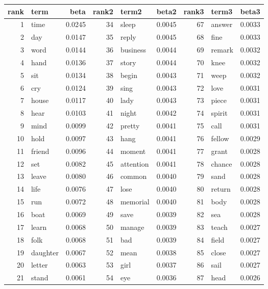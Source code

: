\begin{table}[ht]
\centering
\begin{tabular}{rlrrlrrlr}
  \hline
rank & term & beta & rank2 & term2 & beta2 & rank3 & term3 & beta3 \\ 
  \hline
1 & time & 0.0245 & 34 & sleep & 0.0045 & 67 & answer & 0.0033 \\ 
  2 & day & 0.0147 & 35 & reply & 0.0045 & 68 & fine & 0.0033 \\ 
  3 & word & 0.0144 & 36 & business & 0.0044 & 69 & remark & 0.0032 \\ 
  4 & hand & 0.0136 & 37 & story & 0.0044 & 70 & knee & 0.0032 \\ 
  5 & sit & 0.0134 & 38 & begin & 0.0043 & 71 & weep & 0.0032 \\ 
  6 & cry & 0.0124 & 39 & sing & 0.0043 & 72 & love & 0.0031 \\ 
  7 & house & 0.0117 & 40 & lady & 0.0043 & 73 & piece & 0.0031 \\ 
  8 & hear & 0.0103 & 41 & night & 0.0042 & 74 & spirit & 0.0031 \\ 
  9 & mind & 0.0099 & 42 & pretty & 0.0041 & 75 & call & 0.0031 \\ 
  10 & hold & 0.0097 & 43 & hang & 0.0041 & 76 & fellow & 0.0029 \\ 
  11 & friend & 0.0096 & 44 & moment & 0.0041 & 77 & grant & 0.0028 \\ 
  12 & set & 0.0082 & 45 & attention & 0.0041 & 78 & chance & 0.0028 \\ 
  13 & leave & 0.0080 & 46 & common & 0.0040 & 79 & sand & 0.0028 \\ 
  14 & life & 0.0076 & 47 & lose & 0.0040 & 80 & return & 0.0028 \\ 
  15 & run & 0.0072 & 48 & memorial & 0.0040 & 81 & body & 0.0028 \\ 
  16 & boat & 0.0069 & 49 & save & 0.0039 & 82 & sea & 0.0028 \\ 
  17 & learn & 0.0068 & 50 & manage & 0.0039 & 83 & teach & 0.0027 \\ 
  18 & folk & 0.0068 & 51 & bad & 0.0039 & 84 & field & 0.0027 \\ 
  19 & daughter & 0.0067 & 52 & mean & 0.0038 & 85 & close & 0.0027 \\ 
  20 & letter & 0.0063 & 53 & girl & 0.0037 & 86 & sail & 0.0027 \\ 
  21 & stand & 0.0061 & 54 & eye & 0.0036 & 87 & head & 0.0026 \\ 

\end{tabular}
\end{table}
